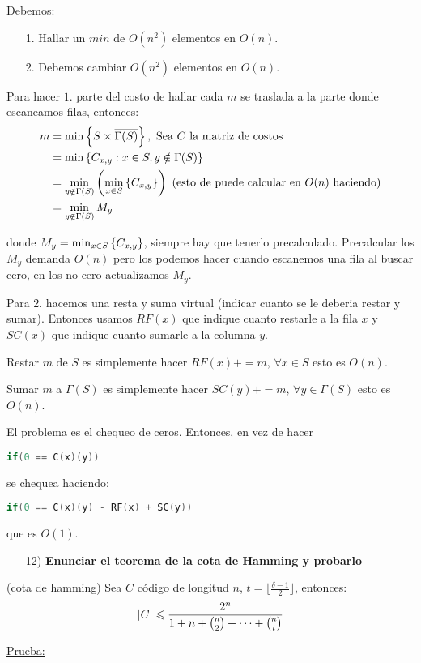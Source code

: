 \documentclass[12pt,a4paper]{article}
\begin{document}
Debemos:
\begin{itemize}
    \item [1.] Hallar un $min$ de $O(n^{2})$ elementos en $O(n)$.
    \item [2.] Debemos cambiar $O(n^{2})$ elementos en $O(n)$.
\end{itemize}

Para hacer $1.$ parte del costo de hallar cada $m$ se traslada a la parte donde 
escaneamos filas, entonces:
\begin{align*}
    m &= \min \left\lbrace S \times \overline{\Gamma(S)} \right\rbrace,\,\, \text{Sea $C$ la matriz de costos} \\
    &= \min \left\lbrace C_{x,y} : x \in S, y \notin \Gamma(S) \right\rbrace \\
    &= \min_{y\notin \Gamma(S)} \left(\min_{x\in S}\left\lbrace C_{x,y} \right\rbrace\right)\,\,(\text{esto de puede calcular en $O(n)$ haciendo})\\
    &= \min_{y \notin \Gamma(S)} M_{y} 
\end{align*}

donde $M_{y} = \min_{x\in S}\left\lbrace C_{x,y} \right\rbrace$, siempre hay que tenerlo precalculado. Precalcular 
los $M_{y}$ demanda $O(n)$ pero los podemos hacer cuando escanemos una fila al 
buscar cero, en los no cero actualizamos $M_{y}$.
\medskip

Para $2.$ hacemos una resta y suma virtual (indicar cuanto se le deberia restar y sumar). 
Entonces usamos $RF(x)$ que indique cuanto restarle a la fila $x$ y $SC(x)$ que indique 
cuanto sumarle a la columna $y$.
\medskip

Restar $m$ de $S$ es simplemente hacer $RF(x) += m,\, \forall x\in S$ esto es $O(n)$.

Sumar $m$ a $\Gamma(S)$ es simplemente hacer $SC(y) += m,\, \forall y\in \Gamma(S)$ esto es $O(n)$.
\medskip

El problema es el chequeo de ceros. Entonces, en vez de hacer
\begin{lstlisting}[language=C]
    if(0 == C(x)(y))
\end{lstlisting}

se chequea haciendo:
\begin{lstlisting}[language=C]
    if(0 == C(x)(y) - RF(x) + SC(y))
\end{lstlisting}
que es $O(1)$.

\begin{itemize}
    \item [12)] \textbf{Enunciar el teorema de la cota de Hamming y probarlo}
    \label{dem:hamming}
\end{itemize}
\begin{teorema} (cota de hamming) Sea $C$ código de longitud $n$, $t = \lfloor \frac{\delta -1}{2} \rfloor$, entonces:
    $$|C| \leqslant \frac{2^{n}}{1+n+ \binom{n}{2} + \cdots + \binom{n}{t}}$$
\end{teorema}
\underline{Prueba:}
\end{document}
